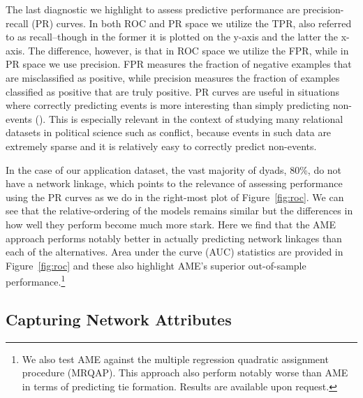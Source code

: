 The last diagnostic we highlight to assess predictive performance are precision-recall (PR) curves. In both ROC and PR space we utilize the TPR, also referred to as recall--though in the former it is plotted on the y-axis and the latter the x-axis. The difference, however, is that in ROC space we utilize the FPR, while in PR space we use precision. FPR measures the fraction of negative examples that are misclassified as positive, while precision measures the fraction of examples classified as positive that are truly positive. PR curves are useful in situations where correctly predicting events is more interesting than simply predicting non-events (\citealt{davis:goadrich:2006}). This is especially relevant in the context of studying many relational datasets in political science such as conflict, because events in such data are extremely sparse and it is relatively easy to correctly predict non-events. 

In the case of our application dataset, the vast majority of dyads, 80\%, do not have a network linkage, which points to the relevance of assessing performance using the PR curves as we do in the right-most plot of Figure~\ref{fig:roc}. We can see that the relative-ordering of the models remains similar but the differences in how well they perform become much more stark. Here we find that the AME approach performs notably better in actually predicting network linkages than each of the alternatives. Area under the curve (AUC) statistics are provided in Figure~\ref{fig:roc} and these also highlight AME's superior out-of-sample performance.\footnote{We also test AME against the multiple regression quadratic assignment procedure (MRQAP). This approach also perform notably worse than AME in terms of predicting tie formation. Results are available upon request.}

\FloatBarrier

\subsection*{Capturing Network Attributes}

